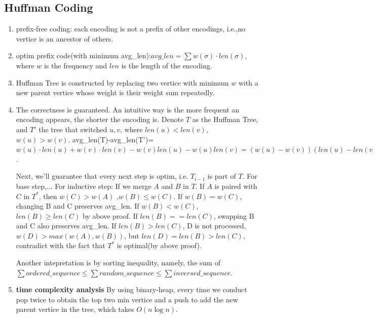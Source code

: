 \subsection{Huffman Coding}
\begin{enumerate}
    \item prefix-free coding: each encoding is not a prefix of other encodings, i.e.,no vertice is an ancestor of others.
    \item optim prefix code(with minimum avg\_len):$avg\_len=\sum w(\sigma)\cdot len(\sigma)$, where $w$ is the frequency and $len$ is the length of the encoding.
    \item Huffman Tree is constructed by replacing two vertice with minimum $w$ with a new parent vertice whose weight is their weight sum repeatedly.
    \item The correctness is guaranteed. An intuitive way is the more frequent an encoding appears, the shorter the encoding is.
    Denote $T$ as the Huffman Tree, and $T'$ the tree that switched $u,v$, where $len(u)<len(v)$, $w(u)>w(v)$.
    avg\_len(T)-avg\_len(T')=$w(u)\cdot len(u)+w(v)\cdot len(v)-w(v)len(u)-w(u)len(v)=(w(u)-w(v))(len(u)-len(v)) <0$.

    Next, we'll guarantee that every next step is optim, i.e. $T_{i-1}$ is part of $T$.
    For base step,...
    For inductive step: If we merge $A$ and $B$ in $T$. If $A$ is paired with $C$ in $T^*$, then $w(C)>w(A)$ ,$w(B)\leq w(C)$. If $w(B)=w(C)$, changing B and C preserves avg\_len.
    If $w(B) < w(C)$, $len(B)\geq len(C)$ by above proof. If $len(B)==len(C)$, swapping B and C also preserves avg\_len. If $len(B)>len(C)$, D is not processed, $w(D)> max(w(A),w(B))$, but $len(D)=len(B)>len(C)$, contradict with the fact that $T^*$ is optimal(by above proof).

    Another intepretation is by sorting inequality, namely, the sum of $\sum ordered\_sequence \leq \sum random\_sequence \leq \sum inversed\_sequence$.
    \item \textbf{time complexity analysis} By using binary-heap, every time we conduct pop twice to obtain the top two min vertice and a push to add the new parent vertice in the tree, which takes $O(n\log n)$.
\end{enumerate}

